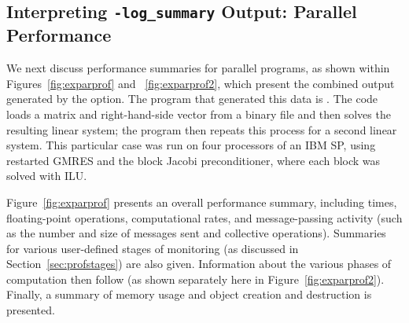 \subsection{Interpreting {\tt -log\_summary} Output: Parallel Performance}
\label{sec:parperformance}

We next discuss performance summaries for parallel programs,
 as shown within Figures~\ref{fig:exparprof} and
~\ref{fig:exparprof2}, which present the combined output generated by
the  option.  The program that generated this data is
.  The code loads a
matrix and right-hand-side vector from a binary file and then solves
the resulting linear system; the program then repeats this process for
a second linear system.  This particular case was run on four
processors of an IBM SP, using restarted GMRES and the block Jacobi
preconditioner, where each block was solved with ILU.

Figure~\ref{fig:exparprof} presents an overall performance summary,
including times, floating-point operations, computational rates, and
message-passing activity (such as the number and size of messages sent
and collective operations).  Summaries for various user-defined stages
of monitoring (as discussed in Section~\ref{sec:profstages}) are also
given. Information about the various phases of computation then follow
(as shown separately here in Figure~\ref{fig:exparprof2}).
Finally, a summary of memory usage and object creation and destruction
is presented.

